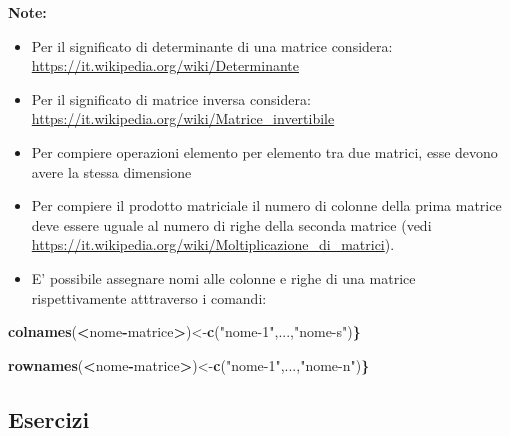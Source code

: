 \documentclass[
]{book}
\newenvironment{Shaded}{\begin{snugshade}}{\end{snugshade}}
\newcommand{\ErrorTok}[1]{\textcolor[rgb]{0.64,0.00,0.00}{\textbf{#1}}}
\newcommand{\KeywordTok}[1]{\textcolor[rgb]{0.13,0.29,0.53}{\textbf{#1}}}
\newcommand{\NormalTok}[1]{#1}
\newcommand{\OperatorTok}[1]{\textcolor[rgb]{0.81,0.36,0.00}{\textbf{#1}}}
\newcommand{\StringTok}[1]{\textcolor[rgb]{0.31,0.60,0.02}{#1}}
\providecommand{\tightlist}{%
  \setlength{\itemsep}{0pt}\setlength{\parskip}{0pt}}
\begin{document}
\textbf{Note:}

\begin{itemize}
\tightlist
\item
  Per il significato di determinante di una matrice considera: \url{https://it.wikipedia.org/wiki/Determinante}
\item
  Per il significato di matrice inversa considera: \url{https://it.wikipedia.org/wiki/Matrice_invertibile}
\item
  Per compiere operazioni elemento per elemento tra due matrici, esse devono avere la stessa dimensione
\item
  Per compiere il prodotto matriciale il numero di colonne della prima matrice deve essere uguale al numero di righe della seconda matrice (vedi \url{https://it.wikipedia.org/wiki/Moltiplicazione_di_matrici}).
\item
  E' possibile assegnare nomi alle colonne e righe di una matrice rispettivamente atttraverso i comandi:
\end{itemize}

\begin{Shaded}
\begin{Highlighting}[]
\KeywordTok{colnames}\NormalTok{(}\OperatorTok{<}\NormalTok{nome}\OperatorTok{-}\NormalTok{matrice}\OperatorTok{>}\NormalTok{)<-}\KeywordTok{c}\NormalTok{(}\StringTok{"nome-1"}\NormalTok{,...,}\StringTok{"nome-s"}\NormalTok{)}\ErrorTok{\}}

\KeywordTok{rownames}\NormalTok{(}\OperatorTok{<}\NormalTok{nome}\OperatorTok{-}\NormalTok{matrice}\OperatorTok{>}\NormalTok{)<-}\KeywordTok{c}\NormalTok{(}\StringTok{"nome-1"}\NormalTok{,...,}\StringTok{"nome-n"}\NormalTok{)}\ErrorTok{\}}
\end{Highlighting}
\end{Shaded}

\hypertarget{esercizi-7}{%
\subsection*{Esercizi}\label{esercizi-7}}
\end{document}
